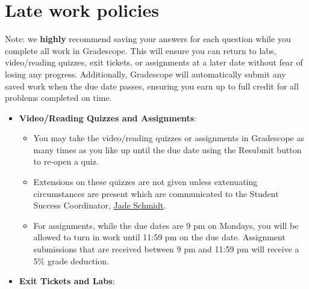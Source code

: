 \documentclass[
]{article}
\providecommand{\tightlist}{%
  \setlength{\itemsep}{0pt}\setlength{\parskip}{0pt}}
\begin{document}
\section{Late work policies}\label{late-work-policies}

Note: we \textbf{highly} recommend saving your answers for each question
while you complete all work in Gradescope. This will ensure you can
return to labs, video/reading quizzes, exit tickets, or assignments at a
later date without fear of losing any progress. Additionally, Gradescope
will automatically submit any saved work when the due date passes,
ensuring you earn up to full credit for all problems completed on time.

\begin{itemize}
\tightlist
\item
  \textbf{Video/Reading Quizzes and Assignments}:

  \begin{itemize}
  \tightlist
  \item
    You may take the video/reading quizzes or assignments in Gradescope
    as many times as you like up until the due date using the Resubmit
    button to re-open a quiz.
  \item
    Extensions on these quizzes are not given unless extenuating
    circumstances are present which are communicated to the Student
    Success Coordinator, \href{jade.schmidt2@montana.edu}{Jade Schmidt}.
  \item
    For assignments, while the due dates are 9 pm on Mondays, you will
    be allowed to turn in work until 11:59 pm on the due date.
    Assignment submissions that are received between 9 pm and 11:59 pm
    will receive a 5\% grade deduction.
  \end{itemize}
\item
  \textbf{Exit Tickets and Labs}:


\end{itemize}
\end{document}
